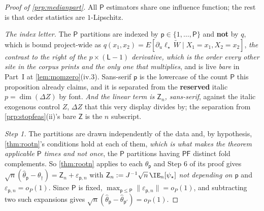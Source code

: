 \begin{proof}[Proof of \cref{prp:medianpart}]
All $\mathsf P$ estimators share one influence function; the rest is that order statistics are
$1$-Lipschitz.

\emph{The index letter.} The $\mathsf P$ partitions are indexed by
$\mathsf p\in\{1,\dots,\mathsf P\}$ and \textbf{not} by $q$, which is bound project-wide as
$q(x_1,x_2)=E[\partial_u\ell_\star\,\widetilde W\mid X_1=x_1,X_2=x_2]$, \emph{the contrast to the right
of the $p\times(\mathsf L-1)$ derivative, which is the order every other site in the corpus prints and the
only one that multiplies}, and is live \emph{bare} in Part~I at
\cref{lem:momzero}\textup{(iv.3)}. Sans-serif $\mathsf p$ is the lowercase of the count
$\mathsf P$ this proposition already claims, and it is separated from the \textbf{reserved} italic
$p=\dim(\Delta Z)$ by font. \emph{And the linear term is $\mathsf Z_n$, sans-serif}, against the italic
exogenous control $Z$, $\Delta Z$ that this very display divides by; the separation from
\cref{prp:stopfeas}\textup{(ii)}'s bare $\mathsf Z$ is the $n$ subscript.

\emph{Step 1.} The partitions are drawn independently of the data and, by hypothesis, \cref{thm:rootn}'s
conditions hold at each of them, \emph{which is what makes the theorem applicable $\mathsf P$ times and
not once}, the $\mathsf P$ partitions having $\mathsf P\mathsf F$ distinct fold complements. So
\cref{thm:rootn} applies to each $\hat\theta_{\mathsf p}$ and Step 6 of its proof gives
$\sqrt n(\hat\theta_{\mathsf p}-\theta_\dagger)=\mathsf Z_n+\varepsilon_{\mathsf p,n}$ with
$\mathsf Z_n:=J^{-1}\sqrt n\,\IE_n[\psi_\star]$ \emph{not depending on $\mathsf p$} and
$\varepsilon_{\mathsf p,n}=o_P(1)$.
Since $\mathsf P$ is fixed, $\max_{\mathsf p\le\mathsf P}\|\varepsilon_{\mathsf p,n}\|=o_P(1)$, and
subtracting two such expansions gives
$\sqrt n(\hat\theta_{\mathsf p}-\hat\theta_{\mathsf p'})=o_P(1)$.


\end{proof}
